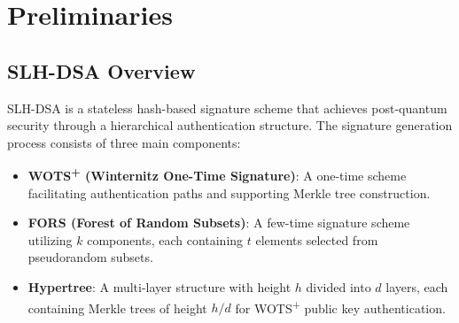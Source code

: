 \documentclass[journal]{IEEEtran}
\begin{document}
\section{Preliminaries}\label{sec:preliminaries}

\subsection{SLH-DSA Overview}

SLH-DSA is a stateless hash-based signature scheme that achieves post-quantum security through a hierarchical authentication structure. The signature generation process consists of three main components:

\begin{itemize}
  \item \textbf{WOTS\textsuperscript{+} (Winternitz One-Time Signature)}: A one-time scheme facilitating authentication paths and supporting Merkle tree construction.
  \item \textbf{FORS (Forest of Random Subsets)}: A few-time signature scheme utilizing $k$ components, each containing $t$ elements selected from pseudorandom subsets.
  \item \textbf{Hypertree}: A multi-layer structure with height $h$ divided into $d$ layers, each containing Merkle trees of height $h/d$ for WOTS\textsuperscript{+} public key authentication.
\end{itemize}
\end{document}
